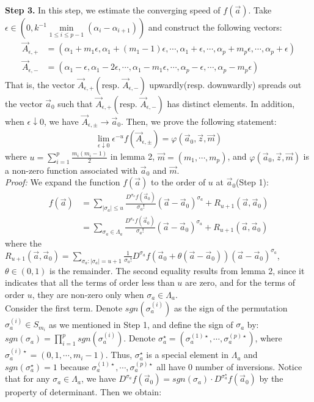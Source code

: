 \documentclass[12pt]{article}
\begin{document}
\textbf{Step 3. }In this step, we estimate the converging speed of $f(\vec{a})$. Take $\epsilon\in (0,k^{-1}\min\limits_{1\leqslant i\leqslant p-1}(\alpha_{i}-\alpha_{i+1}))$ and construct the following vectors:
\begin{align*}
	\vec{A}_{\epsilon,+}&=(\alpha_{1}+m_{1}\epsilon, \alpha_{1}+(m_{1}-1)\epsilon,\cdots,\alpha_{1}+\epsilon,\cdots,\alpha_{p}+m_{p}\epsilon,\cdots,\alpha_{p}+\epsilon)\\
	\vec{A}_{\epsilon,-}&=(\alpha_{1}-\epsilon, \alpha_{1}-2\epsilon,\cdots,\alpha_{1}-m_{1}\epsilon,\cdots,\alpha_{p}-\epsilon,\cdots,\alpha_{p}-m_{p}\epsilon)
\end{align*}
That is, the vector $\vec{A}_{\epsilon,+}(\text{resp. }\vec{A}_{\epsilon,-})$ upwardly(resp. downwardly) spreads out the vector $\vec{a}_{0}$ such that $\vec{A}_{\epsilon,+}(\text{resp. }\vec{A}_{\epsilon,-})$ has distinct elements. In addition, when $\epsilon\downarrow 0$, we have $\vec{A}_{\epsilon,\pm}\rightarrow\vec{a}_{0}$. Then, we prove the following statement:
\begin{align*}
	\lim_{\epsilon\downarrow 0}\epsilon^{-u}f(\vec{A}_{\epsilon,\pm})=\varphi(\vec{a}_{0},\vec{z},\vec{m})
\end{align*}
where $u=\sum_{i=1}^{p}\frac{m_{i}(m_{i}-1)}{2}$ in lemma 2, $\vec{m}=(m_{1},\cdots,m_{p})$, and $\varphi(\vec{a}_{0},\vec{z},\vec{m})$ is a non-zero function associated with $\vec{a}_{0}$ and $\vec{m}$.\\
\emph{Proof:} We expand the function $f(\vec{a})$ to the order of $u$ at $\vec{a}_{0}$(Step 1):
\begin{align*}
	f(\vec{a})&=\sum_{|\sigma_{a}|\leqslant u}\frac{D^{\sigma_{a}}f(\vec{a}_{0})}{\sigma_{a}!}(\vec{a}-\vec{a}_{0})^{\sigma_{a}}+R_{u+1}(\vec{a},\vec{a}_{0})\\
	&= \sum_{\sigma_{a}\in \Lambda_{a}}\frac{D^{\sigma_{a}}f(\vec{a}_{0})}{\sigma_{a}!}(\vec{a}-\vec{a}_{0})^{\sigma_{a}}+R_{u+1}(\vec{a},\vec{a}_{0})
\end{align*} 
where the $R_{u+1}(\vec{a},\vec{a}_{0})=\sum_{\sigma_{a}:|\sigma_{a}|=u+1}\frac{1}{\sigma_{a}!}D^{\sigma_{a}}f(\vec{a}_{0}+\theta(\vec{a}-\vec{a}_{0}))(\vec{a}-\vec{a}_{0})^{\sigma_{a}}$, $\theta\in(0,1)$ is the remainder. The second equality results from lemma 2, since it indicates that all the terms of order less than $u$ are zero, and for the terms of order $u$, they are non-zero only when $\sigma_{a}\in\Lambda_{a}$.\\
Consider the first term. Denote $sgn(\sigma_{a}^{(i)})$ as the sign of the permutation $\sigma_{a}^{(i)}\in S_{m_i}$ as we mentioned in Step 1, and define the sign of $\sigma_{a}$ by: $sgn(\sigma_{a})=\prod_{i=1}^{p}sgn(\sigma_{a}^{(i)})$. Denote $\sigma_{a}^{\star}=(\sigma_{a}^{(1)\star},\cdots,\sigma_{a}^{(p)\star})$, where $\sigma_{a}^{(i)\star}=(0,1,\cdots,m_i-1)$. Thus, $\sigma_{a}^{\star}$ is a special element in $\Lambda_{a}$ and $sgn(\sigma_{a}^{\star})=1$ because $\sigma_{a}^{(1)\star},\cdots,\sigma_{a}^{(p)\star}$ all have $0$ number of inversions. Notice that for any $\sigma_{a}\in\Lambda_{a}$, we have $D^{\sigma_{a}}f(\vec{a}_{0})=sgn(\sigma_{a})\cdot D^{\sigma_{a}^{\star}}f(\vec{a}_{0})$ by the property of determinant. Then we obtain:
\end{document}
